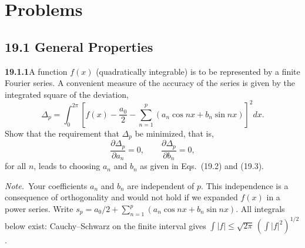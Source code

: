 
\section*{Problems}

\subsection*{19.1 General Properties}

\par\bigskip
\noindent\textbf{19.1.1}\quad A  function $f(x)$ (quadratically
integrable) is to be represented by a finite Fourier series. A
convenient measure of the accuracy of the series is given by the
integrated square of the deviation,
\[
\Delta_{p}=\int_{0}^{2\pi}\left[f(x)-\frac{a_{0}}{2}
-\sum_{n=1}^{p}(a_{n}\cos nx+b_{n}\sin nx)\right]^{2}dx.
\]
Show that the requirement that $\Delta_{p}$ be minimized, that is,
\[
\frac{\partial\Delta_{p}}{\partial a_{n}}=0,\qquad
\frac{\partial\Delta_{p}}{\partial b_{n}}=0,
\]
for all $n$, leads to choosing $a_{n}$ and $b_{n}$ as given in
Eqs.~(19.2) and (19.3).
\par\emph{Note.}~Your coefficients $a_{n}$ and $b_{n}$ are
independent of $p$. This independence is a consequence of
orthogonality and would not hold if we expanded $f(x)$ in a power
series.
\solution
Write $s_p=a_0/2+\sum_{n=1}^p(a_n\cos nx+b_n\sin nx)$.
All integrals below exist: Cauchy--Schwarz on the finite interval gives
$\int|f|\le\sqrt{2\pi}\,(\int|f|^2)^{1/2}$.


